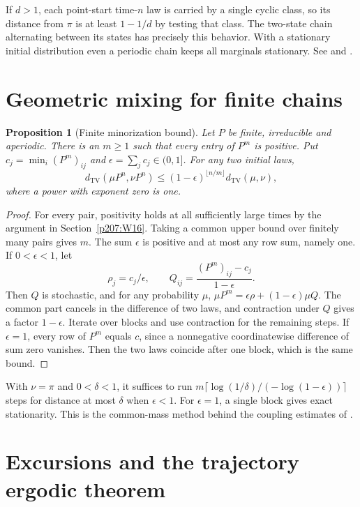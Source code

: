 \documentclass[11pt,oneside,openany]{book}
\theoremstyle{plain}
\newtheorem{proposition}[theorem]{Proposition}
\theoremstyle{definition}
\theoremstyle{remark}
\begin{document}
If \(d>1\), each point-start time-\(n\) law is carried by a single
cyclic class, so its distance from \(\pi\) is at least \(1-1/d\)
by testing that class. The two-state chain alternating between its
states has precisely this behavior. With a stationary initial
distribution even a periodic chain keeps all marginals stationary.
See \cite[Sections 1.7--1.8]{Norris} and
\cite[Equation (5.6.1)]{Durrett}.

\section{Geometric mixing for finite chains}\label{p207:W18}

\begin{proposition}[Finite minorization bound]
Let \(P\) be finite, irreducible and aperiodic. There is an \(m\ge1\)
such that every entry of \(P^m\) is positive. Put
\(c_j=\min_i(P^m)_{ij}\) and \(\epsilon=\sum_jc_j\in(0,1]\).
For any two initial laws,
\[
 d_{\mathrm{TV}}(\mu P^n,\nu P^n)
 \le (1-\epsilon)^{\lfloor n/m\rfloor}
       d_{\mathrm{TV}}(\mu,\nu),
\]
where a power with exponent zero is one.
\end{proposition}
\begin{proof}
For every pair, positivity holds at all sufficiently large times
by the argument in Section~\ref{p207:W16}. Taking a common upper
bound over finitely many pairs gives \(m\).
The sum \(\epsilon\) is positive and at most any row sum, namely one.
If \(0<\epsilon<1\), let
\[
 \rho_j=c_j/\epsilon,\qquad
 Q_{ij}=\frac{(P^m)_{ij}-c_j}{1-\epsilon}.
\]
Then \(Q\) is stochastic, and for any probability \(\mu\),
\(\mu P^m=\epsilon\rho+(1-\epsilon)\mu Q\).
The common part cancels in the difference of two laws, and
contraction under \(Q\) gives a factor \(1-\epsilon\).
Iterate over blocks and use contraction for the remaining steps.
If \(\epsilon=1\), every row of \(P^m\) equals \(c\), since a
nonnegative coordinatewise difference of sum zero vanishes.
Then the two laws coincide after one block, which is the same bound.
\end{proof}

With \(\nu=\pi\) and \(0<\delta<1\), it suffices to run
\(m\lceil \log(1/\delta)/(-\log(1-\epsilon))\rceil\) steps for
distance at most \(\delta\) when \(\epsilon<1\).
For \(\epsilon=1\), a single block gives exact stationarity.
This is the common-mass method behind the coupling estimates of
\cite[Section 5.6]{Durrett}.

\section{Excursions and the trajectory ergodic theorem}
\label{p207:W19}
\end{document}
